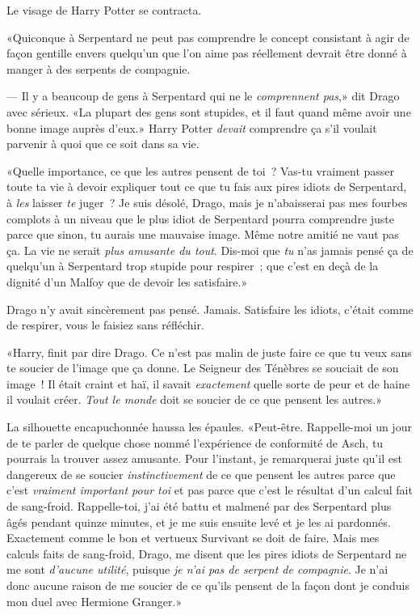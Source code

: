 Le visage de Harry Potter se contracta.

«Quiconque à Serpentard ne peut pas comprendre le concept consistant à agir de façon gentille envers quelqu'un que l'on aime pas réellement devrait être donné à manger à des serpents de compagnie.

--- Il y a beaucoup de gens à Serpentard qui ne le \emph{comprennent pas},» dit Drago avec sérieux. «La plupart des gens sont stupides, et il faut quand même avoir une bonne image auprès d'eux.» Harry Potter \emph{devait} comprendre ça s'il voulait parvenir à quoi que ce soit dans sa vie.

«Quelle importance, ce que les autres pensent de toi~? Vas-tu vraiment passer toute ta vie à devoir expliquer tout ce que tu fais aux pires idiots de Serpentard, à \emph{les} laisser \emph{te} juger~? Je suis désolé, Drago, mais je n'abaisserai pas mes fourbes complots à un niveau que le plus idiot de Serpentard pourra comprendre juste parce que sinon, tu aurais une mauvaise image. Même notre amitié ne vaut pas ça. La vie ne serait \emph{plus amusante du tout}. Dis-moi que \emph{tu} n'as jamais pensé ça de quelqu'un à Serpentard trop stupide pour respirer~; que c'est en deçà de la dignité d'un Malfoy que de devoir les satisfaire.»

Drago n'y avait sincèrement pas pensé. Jamais. Satisfaire les idiots, c'était comme de respirer, vous le faisiez sans réfléchir.

«Harry, finit par dire Drago. Ce n'est pas malin de juste faire ce que tu veux sans te soucier de l'image que ça donne. Le Seigneur des Ténèbres se souciait de son image~! Il était craint et haï, il savait \emph{exactement} quelle sorte de peur et de haine il voulait créer. \emph{Tout le monde} doit se soucier de ce que pensent les autres.»

La silhouette encapuchonnée haussa les épaules. «Peut-être. Rappelle-moi un jour de te parler de quelque chose nommé l'expérience de conformité de Asch, tu pourrais la trouver assez amusante. Pour l'instant, je remarquerai juste qu'il est dangereux de se soucier \emph{instinctivement} de ce que pensent les autres parce que c'est \emph{vraiment important pour toi} et pas parce que c'est le résultat d'un calcul fait de sang-froid. Rappelle-toi, j'ai été battu et malmené par des Serpentard plus âgés pendant quinze minutes, et je me suis ensuite levé et je les ai pardonnés. Exactement comme le bon et vertueux Survivant se doit de faire. Mais mes calculs faits de sang-froid, Drago, me disent que les pires idiots de Serpentard ne me sont \emph{d'aucune utilité}, puisque \emph{je n'ai pas de serpent de compagnie}. Je n'ai donc aucune raison de me soucier de ce qu'ils pensent de la façon dont je conduis mon duel avec Hermione Granger.»

